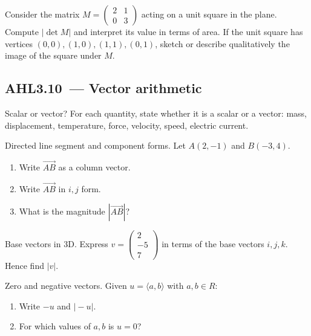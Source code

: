 \documentclass[11pt]{article}
\def\textbf#1{#1}%
\def\mathbb#1{#1}%
\def\mathbf#1{#1}%
\newcommand{\tocsubsection}[1]{\subsection{#1}}
\newcounter{question}
\begin{document}
\begin{question}
Consider the matrix $M=\begin{pmatrix}2 & 1 \\ 0 & 3\end{pmatrix}$ acting on
a unit square in the plane.  Compute $|\det M|$ and interpret its value in
terms of area.  If the unit square has vertices $(0,0),(1,0),(1,1),(0,1)$,
sketch or describe qualitatively the image of the square under $M$.
\end{question}


\tocsubsection{AHL3.10 — Vector arithmetic}


\begin{question}
\textbf{Scalar or vector?}
For each quantity, state whether it is a scalar or a vector: mass, displacement, temperature, force, velocity, speed, electric current.
\end{question}

\begin{question}
\textbf{Directed line segment and component forms.}
Let $A(2,-1)$ and $B(-3,4)$.
\begin{enumerate}
  \item Write $\overrightarrow{AB}$ as a column vector.
  \item Write $\overrightarrow{AB}$ in $\mathbf{i},\mathbf{j}$ form.
  \item What is the magnitude $|\overrightarrow{AB}|$?
\end{enumerate}
\end{question}

\begin{question}
\textbf{Base vectors in 3D.}
Express $\mathbf{v}=\begin{pmatrix}2\\-5\\7\end{pmatrix}$ in terms of the base vectors $\mathbf{i},\mathbf{j},\mathbf{k}$. Hence find $|\mathbf{v}|$.
\end{question}

\begin{question}
\textbf{Zero and negative vectors.}
Given $\mathbf{u}=\langle a,b\rangle$ with $a,b\in\mathbb{R}$:
\begin{enumerate}
  \item Write $-\mathbf{u}$ and $|\!-\!\mathbf{u}|$.
  \item For which values of $a,b$ is $\mathbf{u}=\mathbf{0}$?
\end{enumerate}
\end{question}
\end{document}
